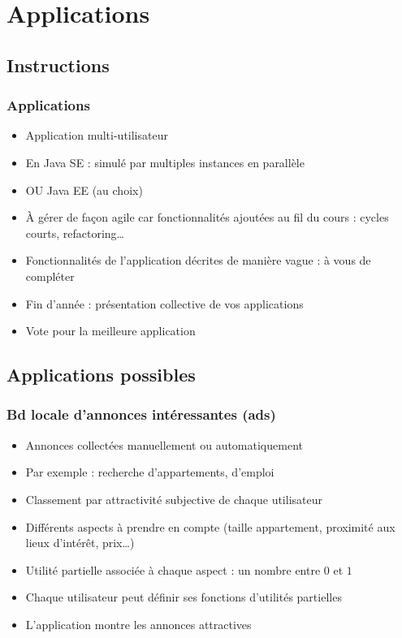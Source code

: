 \documentclass[english, french]{beamer}
\begin{document}
\section{Applications}
\subsection{Instructions}
\begin{frame}
	\frametitle{Applications}
	\begin{itemize}
		\item Application multi-utilisateur
		\item En Java SE : simulé par multiples instances en parallèle
		\item OU Java EE (au choix)
		\item À gérer de façon agile car fonctionnalités ajoutées au fil du cours : cycles courts, refactoring…
		\item Fonctionnalités de l’application décrites de manière vague : à vous de compléter
		\item Fin d’année : présentation collective de vos applications
		\item Vote pour la meilleure application
	\end{itemize}
\end{frame}

\subsection{Applications possibles}
\begin{frame}
	\frametitle{Bd locale d’annonces intéressantes (ads)}
	
	\begin{itemize}
		\item Annonces collectées manuellement {\tiny ou automatiquement}
		\item Par exemple : recherche d’appartements, d’emploi
		\item Classement par attractivité subjective de chaque utilisateur
		\item Différents aspects à prendre en compte (taille appartement, proximité aux lieux d’intérêt, prix…)
		\item Utilité partielle associée à chaque aspect : un nombre entre $0$ et $1$
		\item Chaque utilisateur peut définir ses fonctions d’utilités partielles
		\item L’application montre les annonces attractives
	\end{itemize}
\end{frame}
\end{document}
